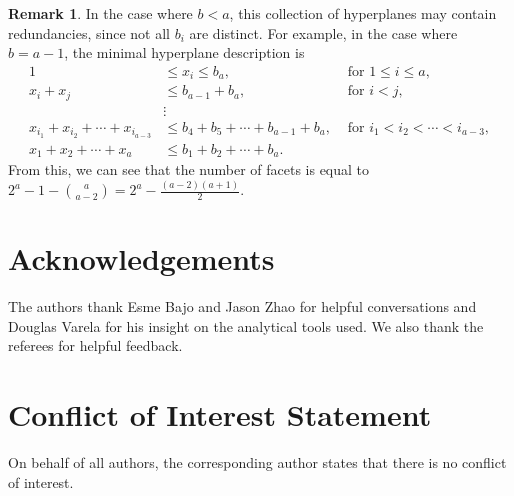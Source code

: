 \documentclass[11pt]{amsart}
\theoremstyle{definition}
\newtheorem{remark}[theorem]{Remark}
\newcommand{\0}{\emptyset}
\begin{document}
\begin{remark}
    In the case where $b<a$, this collection of hyperplanes may contain redundancies, since not all $b_i$ are distinct. For example, in the case where $b = a-1$, the minimal hyperplane description is
\begin{align*}
    1&\leq x_i\leq b_a, &\text{ for } 1\leq i \leq a,\\ 
    x_i+x_j &\leq b_{a-1} + b_a, &\text{ for } i<j,\\ 
    &\vdots \\ 
    x_{i_1} + x_{i_2} + \cdots + x_{i_{a-3}} &\leq  b_4 + b_5+\cdots + b_{a-1}+  b_a, &\text{ for }  i_1 < i_2 < \cdots < i_{a-3}, \\ 
    x_1+x_2+\cdots + x_a &\leq b_1 + b_2 + \cdots + b_{a}.
\end{align*}
From this, we can see that the number of facets is equal to  $2^a -1 - \binom{a}{a-2} = 2^a -\frac{(a-2)(a+1)}{2}$.
\end{remark}






\section*{Acknowledgements}

The authors thank Esme Bajo and Jason Zhao for helpful conversations and Douglas Varela for his insight on the analytical tools used. We also thank the referees for helpful feedback.



\section*{Conflict of Interest Statement}
On behalf of all authors, the corresponding author states that there is no conflict of interest.




\end{document}
